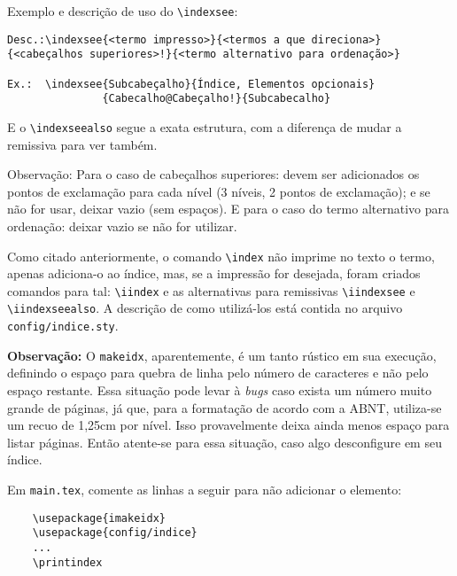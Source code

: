     Exemplo e descrição de uso do \verb|\indexsee|:
\begin{verbatim}
Desc.:\indexsee{<termo impresso>}{<termos a que direciona>}
{<cabeçalhos superiores>!}{<termo alternativo para ordenação>}

Ex.:  \indexsee{Subcabeçalho}{Índice, Elementos opcionais}
               {Cabecalho@Cabeçalho!}{Subcabecalho}
\end{verbatim}%
E o \verb|\indexseealso| segue a exata estrutura, com a diferença de mudar a remissiva para ver também. 

    Observação: Para o caso de cabeçalhos superiores: devem ser adicionados os pontos de exclamação para cada nível (3 níveis, 2 pontos de exclamação); e se não for usar, deixar vazio (sem espaços). E para o caso do termo alternativo para ordenação: deixar vazio se não for utilizar.

    Como citado anteriormente, o comando \verb|\index| não imprime no texto o termo, apenas adiciona-o ao índice, mas, se a impressão for desejada, foram criados comandos para tal: \verb|\iindex| e as alternativas para remissivas \verb|\iindexsee| e \verb|\iindexseealso|. A descrição de como utilizá-los está contida no arquivo \texttt{config/indice.sty}.

    \textbf{Observação:} O \texttt{makeidx}, aparentemente, é um tanto rústico em sua execução, definindo o espaço para quebra de linha pelo número de caracteres e não pelo espaço restante. Essa situação pode levar à \textit{bugs} caso exista um número muito grande de páginas, já que, para a formatação de acordo com a ABNT, utiliza-se um recuo de 1,25cm por nível. Isso provavelmente deixa ainda menos espaço para listar páginas. Então atente-se para essa situação, caso algo desconfigure em seu índice.

    Em \texttt{main.tex}, comente as linhas a seguir para não adicionar o elemento: 
\begin{verbatim}
    \usepackage{imakeidx}
    \usepackage{config/indice}
    ...
    \printindex
\end{verbatim}
    